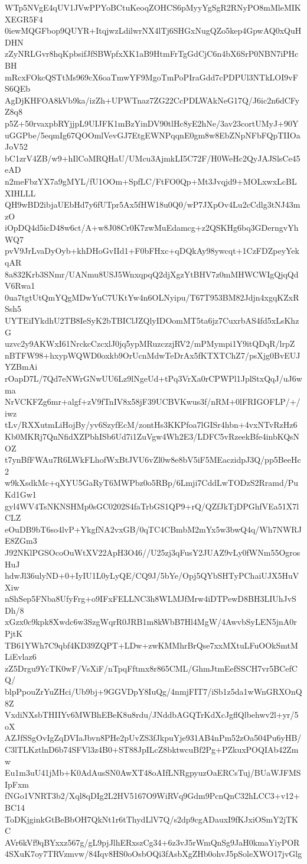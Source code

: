 WTp5NVgE4qUV1JVwPPYoBCtuKeoqZOHCS6pMyyYgSgR2RNyPO8mMleMIKXEGR5F4
0iewMQGFbop9QUYR+ItqjwzLdilwrNX4lTj6SHGxNugQZo5kep4GpwAQ0xQuHDHN
zZyNRLGvr8hqKpbsifJfSBWpfxXK1aB9HtmFrTgGdCjC6n4bX6SrP0NBN7iPHcBH
mRcxFOkcQSTtMs969cX6oaTmwYF9MgoTmPoPIraGdd7cPDPUl3NTkLOI9vFS6QEb
AgDjKHFOA8kVb9ka/izZh+UPWTnaz7ZG22CcPDLWAkNeG17Q/J6ic2n6dCFyZ8q8
p5Z+50rvaxpbRYjjpL9UIJFK1mBzYinDV90tlHc8yE2hNe/3av23cortUMyJ+90Y
uGGPbe/5eqmIg67QOOmlVevGJ7EtgEWNPqqnE0gm8w8EbZNpNFbFQpTIIOaJoV52
bC1zrV4ZB/w9+hIlCoMRQHaU/UMcu3AjmkLI5C72F/H0WeHc2QyJAJSlsCe45eAD
n2meFbzYX7a9gMYL/fU1OOm+SpfLC/FtFO0Qp+Mt3Jvqjd9+MOLxwxLcBLXIHLLL
QH9wBD2ibjaUEbHd7y6fUTpr5Ax5fHW18u0Q0/wP7JXpOv4Lu2cCdlg3tNJ43mzO
iOpDQ4d5icD48w6ct/A+w8J08Cr0K7zwMuEdamcg+z2QSKHg6bq3GDerngvYhWQ7
pvV9JrLvaDyOyb+khDHoGvIId1+F0bFHxc+qDQkAy98ywcqt+1CzFDZpeyYekqAR
8a832Krb3SNmr/UANmu8USJ5WnxqpqQ2djXgzYtBHV7z0mMHWCWIgQjqQdV6Rwa1
0ua7tgtUtQmYQgMDwYuC7UKtYw4n6OLNyipu/T67T953BM82Jdjn4xgqKZxRSsh5
UYTEiIYkdhU2TB8IeSyK2bTBIClJZQlyIDOomMT5ta6jz7CuxrbAS4fd5xLsKhzG
uzvc2y9AKWxI61NrckcCzcxlJ0jq5ypMRuzczzjRV2/mPMympi1Y9itQDqR/lrpZ
nBTFW98+hxypWQWD0oxkb9OrUcnMdwTeDrAx5fKTXTChZ7/psXjg0BvEUJYZBmAi
rOapD7L/7Qd7eNWrGNwUU6Lz9lNgeUd+tPq3VrXa0rCPWPl1JplStxQqJ/uJ6wma
NrVCKFZg6mr+algf+zV9fTnIV8x58jF39UCBVKwus3f/nRM+0lFRIGOFLP/+/iwz
tLv/RXXutmLiHojBy/yv6SzyfEcM/zontHs3KKPfoa7lGISr4hbn+4vxNTvRzHz6
Kb0MKRj7QnNfidXZPbhISb6Ud7i1ZuVgw4Wh2E3/LDFC5vRzeekBfe4inbKQsNOZ
t7ynBfFWAu7R6LWkFLhofWxBtJVU6vZl0w8e8bV5iF5MEaczidpJ3Q/pp5BeeHc2
w9kXsdkMc+qXYU5GaRyT6MWPbz0o5RBp/6Lmji7CddLwTODzS2Rramd/PuKd1Gw1
gyl4WV4TsNKNSHMp0sGC0202S4faTrbGS1QP9+rQ/QZfJkTjDPGhfVEa51X7lCLZ
eOuDB9bT6so4lvP+YkgfNA2vxGB/0qTC4CBmbM2mYx5w3bwQ4q/Wh7NWRJE8ZGm3
J92NKlPGSOcoOuWtXV22ApH3O46//U25zj3qFusY2JUAZ9vLy0fWNm55OgrosHuJ
hdwJl36ulyND+0+IyIU1L0yLyQE/CQ9J/5bYe/Opj5QYbSHTyPChaiUJX5HuVXiw
nShSep5FNba8UfyFrg+o9IFxFELLNC3h8WLMJfMrw4iDTPewD8BH3LIUhJvSDh/8
xGzx0c9kpk8Xwdc6w3SzgWqrR0JRB1m8kWbB7Hl4MgW/4AwvbSyLEN5jnA0rPjtK
TB61YWh7C9qbf4KD39ZQPT+LDw+zwKMMhrBrQse7xxMXtuLFuOOkSmtMLiEvlaz6
zZ5Drgu9YcTK0wF/VsXiF/nTpqFftmx8r865CML/GhmJtmEefSSCH7vr5BCefCQ/
blpPpouZrYuZHci/Ub9bj+9GGVDpY8IuQg/4nmjFIT7/iSb1z5da1wWnGRXOnQ8Z
VxdiNXsbTHIIYv6MWBhEBeK8u8rdu/JNddbAGQTrKdXcJgflQlbehwv2l+yr/5oX
AZJfSSgOvIgZqDVIaJbvn8PHe2pUvZS3fJkpuYje931AB4nPm52zOa504Pu6yHB/
C3lTLKztlnD6b74SFVl3z4B0+ST88JpILcZ8bktwcuBf2Pg+PZkuxPOQIAb42Zmw
Eu1m3uU41jMb+K0AdAusSN0AwXT48oAIfLNRgpyuzOaERCsTuj/BUaWJFMSIpFxm
fNGo1VNRT3b2/Xql8qDIg2L2HV5167O9WiRVq9Gdm9PcnQnC32hLCC3+v12+BC14
ToDKjginkGtBeBbOH7QkNt1r6tThydLlV7Q/s2dp9cgADauxI9fKJxiOSmY2jTKC
AVr6kVf9qBYxxz567g/gL9pjJlhERxszCg34+6z3vJ5rWmQnSg9JaH0kmaYiyPOR
4SXuK7oy7TRVzmvw/84Iqv8HS0oOsbOQi3fAsbXgZHb0ohvJ5pSoleXWO17jvGlg
